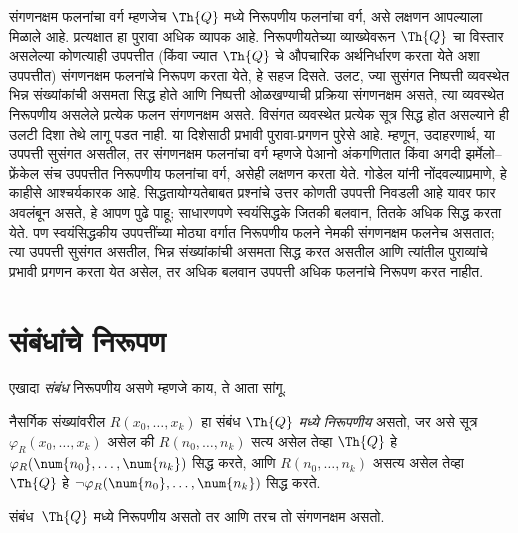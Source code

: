 \begin{explain}
संगणनक्षम फलनांचा वर्ग म्हणजेच $\Th{Q}$ मध्ये निरूपणीय
फलनांचा वर्ग, असे लक्षणन आपल्याला मिळाले आहे. प्रत्यक्षात
हा पुरावा अधिक व्यापक आहे. निरूपणीयतेच्या व्याख्येवरून
$\Th{Q}$ चा विस्तार असलेल्या कोणत्याही उपपत्तीत (किंवा
ज्यात $\Th{Q}$ चे औपचारिक अर्थनिर्धारण करता येते अशा उपपत्तीत)
संगणनक्षम फलनांचे निरूपण करता येते, हे सहज दिसते. उलट,
ज्या सुसंगत निष्पत्ती व्यवस्थेत भिन्न संख्यांकांची असमता
सिद्ध होते आणि निष्पत्ती ओळखण्याची प्रक्रिया संगणनक्षम
असते, त्या व्यवस्थेत निरूपणीय असलेले प्रत्येक फलन संगणनक्षम
असते. विसंगत व्यवस्थेत प्रत्येक सूत्र सिद्ध होत असल्याने
ही उलटी दिशा तेथे लागू पडत नाही. या दिशेसाठी प्रभावी पुरावा-प्रगणन
पुरेसे आहे. म्हणून, उदाहरणार्थ, या उपपत्ती सुसंगत असतील, तर संगणनक्षम
फलनांचा वर्ग म्हणजे पेआनो अंकगणितात किंवा अगदी
झर्मेलो--फ्रेंकेल संच उपपत्तीत निरूपणीय फलनांचा वर्ग,
असेही लक्षणन करता येते. गोडेल यांनी नोंदवल्याप्रमाणे,
हे काहीसे आश्चर्यकारक आहे. सिद्धतायोग्यतेबाबत प्रश्नांचे
उत्तर कोणती उपपत्ती निवडली आहे यावर फार अवलंबून असते,
हे आपण पुढे पाहू; साधारणपणे स्वयंसिद्धके जितकी बलवान,
तितके अधिक सिद्ध करता येते. पण स्वयंसिद्धकीय उपपत्तींच्या
मोठ्या वर्गात निरूपणीय फलने नेमकी संगणनक्षम फलनेच असतात;
त्या उपपत्ती सुसंगत असतील, भिन्न संख्यांकांची असमता सिद्ध करत असतील
आणि त्यांतील पुराव्यांचे प्रभावी प्रगणन करता येत असेल,
तर अधिक बलवान उपपत्ती अधिक फलनांचे निरूपण करत नाहीत.
\end{explain}












\section{संबंधांचे निरूपण}\label{inc:req:rel:sec}

एखादा \emph{संबंध} निरूपणीय असणे म्हणजे काय, ते आता सांगू.

\begin{defn}
\label{inc:req:rel:defn:representing-relations} नैसर्गिक संख्यांवरील
$R(x_0,\dots,x_k)$ हा संबंध {\em $\Th{Q}$ मध्ये निरूपणीय}
असतो, जर असे सूत्र $\varphi_R(x_0,\dots,x_k)$ असेल की
$R(n_0,\dots,n_k)$ सत्य असेल तेव्हा $\Th{Q}$ हे
$\varphi_R(\num{n_0},\dots,\num{n_k})$ सिद्ध करते, आणि
$R(n_0,\dots,n_k)$ असत्य असेल तेव्हा $\Th{Q}$ हे
$\lnot \varphi_R(\num{n_0},
\dots, \num{n_k})$ सिद्ध करते.
\end{defn}

\begin{thm}
\label{inc:req:rel:thm:representing-rels} संबंध~$\Th{Q}$ मध्ये निरूपणीय
असतो तर आणि तरच तो संगणनक्षम असतो.
\end{thm}

